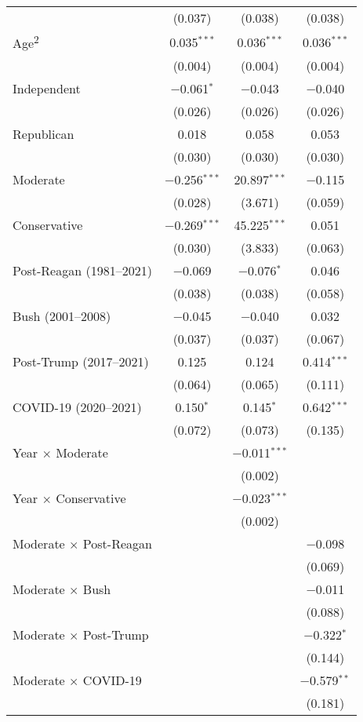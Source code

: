 \begin{ThreePartTable}
\begin{tabularx}{\textwidth}{Xccc}
  & (0.037) & (0.038) & (0.038) \\ 
  Age\textsuperscript{2} & 0.035$^{***}$ & 0.036$^{***}$ & 0.036$^{***}$ \\ 
  & (0.004) & (0.004) & (0.004) \\ 
  Independent & $-$0.061$^{*}$ & $-$0.043 & $-$0.040 \\ 
  & (0.026) & (0.026) & (0.026) \\ 
  Republican & 0.018 & 0.058 & 0.053 \\ 
  & (0.030) & (0.030) & (0.030) \\ 
  Moderate & $-$0.256$^{***}$ & 20.897$^{***}$ & $-$0.115 \\ 
  & (0.028) & (3.671) & (0.059) \\ 
  Conservative & $-$0.269$^{***}$ & 45.225$^{***}$ & 0.051 \\ 
  & (0.030) & (3.833) & (0.063) \\ 
  Post-Reagan (1981--2021) & $-$0.069 & $-$0.076$^{*}$ & 0.046 \\ 
  & (0.038) & (0.038) & (0.058) \\ 
  Bush (2001--2008) & $-$0.045 & $-$0.040 & 0.032 \\ 
  & (0.037) & (0.037) & (0.067) \\ 
  Post-Trump (2017--2021) & 0.125 & 0.124 & 0.414$^{***}$ \\ 
  & (0.064) & (0.065) & (0.111) \\ 
  COVID-19 (2020--2021) & 0.150$^{*}$ & 0.145$^{*}$ & 0.642$^{***}$ \\ 
  & (0.072) & (0.073) & (0.135) \\ 
  Year $\times$ Moderate &  & $-$0.011$^{***}$ &  \\ 
  &  & (0.002) &  \\ 
  Year $\times$ Conservative &  & $-$0.023$^{***}$ &  \\ 
  &  & (0.002) &  \\ 
  Moderate $\times$ Post-Reagan &  &  & $-$0.098 \\ 
  &  &  & (0.069) \\ 
  Moderate $\times$ Bush &  &  & $-$0.011 \\ 
  &  &  & (0.088) \\ 
  Moderate $\times$ Post-Trump &  &  & $-$0.322$^{*}$ \\ 
  &  &  & (0.144) \\ 
  Moderate $\times$ COVID-19 &  &  & $-$0.579$^{**}$ \\ 
  &  &  & (0.181) \\ 

\end{tabularx}
\end{ThreePartTable}
